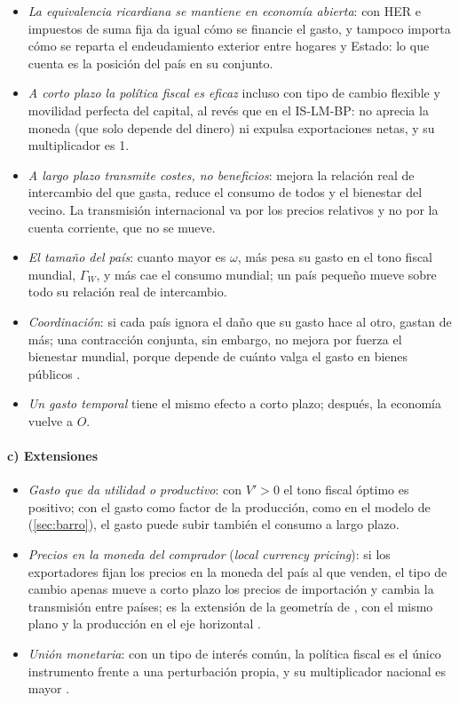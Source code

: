 \documentclass[11pt]{article}
\begin{document}
\begin{itemize}
\item \emph{La equivalencia ricardiana se mantiene en economía abierta}: con HER e impuestos de suma fija da igual cómo se financie el gasto, y tampoco importa cómo se reparta el endeudamiento exterior entre hogares y Estado: lo que cuenta es la posición del país en su conjunto.
\item \emph{A corto plazo la política fiscal es eficaz} incluso con tipo de cambio flexible y movilidad perfecta del capital, al revés que en el IS-LM-BP: no aprecia la moneda (que solo depende del dinero) ni expulsa exportaciones netas, y su multiplicador es 1.
\item \emph{A largo plazo transmite costes, no beneficios}: mejora la relación real de intercambio del que gasta, reduce el consumo de todos y el bienestar del vecino. La transmisión internacional va por los precios relativos y no por la cuenta corriente, que no se mueve.
\item \emph{El tamaño del país}: cuanto mayor es $\omega$, más pesa su gasto en el tono fiscal mundial, $\Gamma_W$, y más cae el consumo mundial; un país pequeño mueve sobre todo su relación real de intercambio.
\item \emph{Coordinación}: si cada país ignora el daño que su gasto hace al otro, gastan de más; una contracción conjunta, sin embargo, no mejora por fuerza el bienestar mundial, porque depende de cuánto valga el gasto en bienes públicos .
\item \emph{Un gasto temporal} tiene el mismo efecto a corto plazo; después, la economía vuelve a $O$.
\end{itemize}

\paragraph{c) Extensiones}

\begin{itemize}
\item \emph{Gasto que da utilidad o productivo}: con $V'>0$ el tono fiscal óptimo es positivo; con el gasto como factor de la producción, como en el modelo de  (\ref{sec:barro}), el gasto puede subir también el consumo a largo plazo.
\item \emph{Precios en la moneda del comprador} (\emph{local currency pricing}): si los exportadores fijan los precios en la moneda del país al que venden, el tipo de cambio apenas mueve a corto plazo los precios de importación y cambia la transmisión entre países; es la extensión de la geometría de \textcite{CorsettiPesenti2009}, con el mismo plano y la producción en el eje horizontal .
\item \emph{Unión monetaria}: con un tipo de interés común, la política fiscal es el único instrumento frente a una perturbación propia, y su multiplicador nacional es mayor\nocite{GaliMonacelli2008Optimal} .
\end{itemize}
\end{document}
